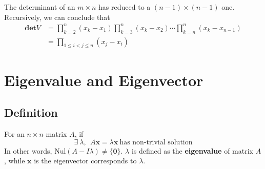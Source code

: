 \documentclass[11pt]{article}
\begin{document}
The determinant of an $m \times n$ has reduced to a $(n-1)\times(n-1)$ one. Recursively, we can conclude that
\begin{equation}
\begin{aligned}
    \bm{det}V  &= \prod_{k=2}^{n}(x_k-x_1) \prod_{k=3}^{n}(x_k-x_2) \cdots \prod_{k=n}^{n}(x_k-x_{n-1})\\
    &= \prod_{1\leq i < j \leq n }(x_j - x_i)
\end{aligned}
\end{equation}
\section{Eigenvalue and Eigenvector}
\subsection{Definition}
For an $n \times n$ matrix $A$, if
\begin{equation}
    \exists~\lambda,~~A\bm{x} = \lambda \bm{x}~\text{has non-trivial solution}
\end{equation}
In other words, $\text{Nul}(A-I\lambda) \neq \{\bm{0}\}$. $\lambda$ is defined as the \textbf{eigenvalue} of matrix $A$, while $\bm{x}$ is the eigenvector corresponds to $\lambda$.
\end{document}
